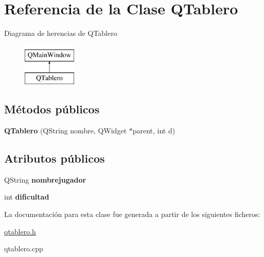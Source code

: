 \hypertarget{class_q_tablero}{\section{Referencia de la Clase Q\-Tablero}
\label{class_q_tablero}
}
Diagrama de herencias de Q\-Tablero\begin{figure}[H]
\begin{center}
\leavevmode
\includegraphics[height=2.000000cm]{class_q_tablero}
\end{center}
\end{figure}
\subsection*{Métodos públicos}
\begin{DoxyCompactItemize}
\item 
\hypertarget{class_q_tablero_ad874f712d2619e753ec1d2e454545d6b}{{\bfseries Q\-Tablero} (Q\-String nombre, Q\-Widget $\ast$parent, int d)}\label{class_q_tablero_ad874f712d2619e753ec1d2e454545d6b}

\end{DoxyCompactItemize}
\subsection*{Atributos públicos}
\begin{DoxyCompactItemize}
\item 
\hypertarget{class_q_tablero_ab6988e6aa07336dc639688ef420f0b10}{Q\-String {\bfseries nombrejugador}}\label{class_q_tablero_ab6988e6aa07336dc639688ef420f0b10}

\item 
\hypertarget{class_q_tablero_a0bd584d1e208a5212d402b30740d4cea}{int {\bfseries dificultad}}\label{class_q_tablero_a0bd584d1e208a5212d402b30740d4cea}

\end{DoxyCompactItemize}


La documentación para esta clase fue generada a partir de los siguientes ficheros\-:\begin{DoxyCompactItemize}
\item 
\hyperlink{qtablero_8h}{qtablero.\-h}\item 
qtablero.\-cpp\end{DoxyCompactItemize}
